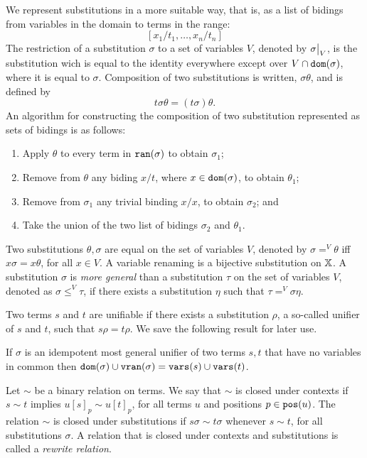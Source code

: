 We represent substitutions in a more suitable way, that is, as a list of bidings from variables in the domain to terms in the range:
$$[x_1 / t_1, \dots, x_n / t_n ]$$
The restriction of a substitution $\sigma$ to a set of variables $V$, denoted by $\restr{\sigma}{V}$, is the substitution wich is equal to the identity everywhere except over $V \cap \mathtt{dom}(\sigma)$, where it is equal to $\sigma$. Composition of two substitutions is written, $\sigma \theta$, and is defined by
$$t\sigma \theta = (t\sigma)\theta.$$
An algorithm for constructing the composition of two substitution represented as sets of bidings is as follows:
\begin{enumerate}
    \item Apply $\theta$ to every term in $\mathtt{ran}(\sigma)$ to obtain $\sigma_1$;
    \item Remove from $\theta$ any biding $x/t$, where $x \in \mathtt{dom}(\sigma)$, to obtain $\theta_1$;
    \item Remove from $\sigma_1$ any trivial binding $x/x$, to obtain $\sigma_2$; and
    \item Take the union of the two list of bidings $\sigma_2$ and $\theta_1$.
\end{enumerate}
Two substitutions $\theta, \sigma$ are equal on the set of variables $V$, denoted by $\sigma =^V \theta$ iff $x \sigma = x \theta$, for all $x \in V$. A variable renaming is a bijective substitution on $\mathbb{X}$. A substitution $\sigma$ is \textit{more general} than a substitution $\tau$ on the set of variables $V$, denoted as $\sigma \leq^V \tau$, if there exists a substitution $\eta$ such that $ \tau =^V \sigma \eta$.


Two terms $s$ and $t$ are unifiable if there exists a substitution $\rho$, a so-called unifier of $s$ and $t$, such that $s \rho = t \rho$.
We save the following result for later use.

\begin{lemma}\label{lemma:unifiers-preserve-variables}
    If $\sigma$ is an idempotent most general unifier of two terms $s, t$ that have no variables in common then $\mathtt{dom}(\sigma) \cup \mathtt{v}\mathtt{ran}(\sigma) = \mathtt{vars}(s) \cup \mathtt{vars}(t)$.
\end{lemma}

Let $\sim$ be a binary relation on terms. We say that $\sim$ is closed under contexts if $s \sim t$ implies $u[s]_p \sim u[t]_p$, for all terms $u$ and positions $p \in \mathtt{pos}(u)$. The relation $\sim$ is closed under substitutions if $s\sigma \sim t\sigma$ whenever $s \sim t$, for all substitutions $\sigma$. A relation that is closed under contexts and substitutions is called a \textit{rewrite relation}.

